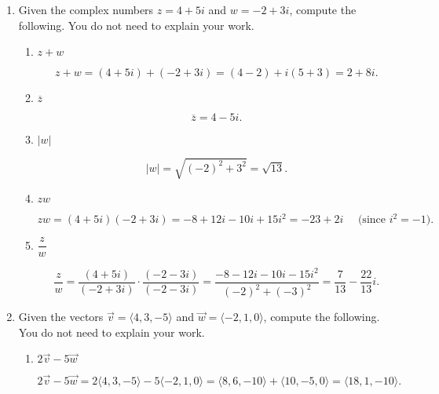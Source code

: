\documentclass[12pt]{article}
\newcommand{\points}[1]{\marginpar{\hspace{24pt}[#1]}}
\newcommand{\abs}[1]{\lvert #1\rvert}
\begin{document}
\begin{enumerate}
\item Given the complex numbers $z=4+5i$ and $w=-2+3i$, compute the following. You do not need to explain your work.
 \begin{enumerate}
\item $z+w$ \points{2}

\bigskip

\[
 z+w = (4+5i)+(-2+3i) = (4-2)+i(5+3) = 2+8i.
\]

\vspace{0.5in}

\item $\overline{z}$ \points{2}

\bigskip

\[
 \overline{z} = 4-5i.
\]

\vspace{0.5in}

\item $\abs{w}$ \points{2}

\bigskip

\[
 \abs{w} = \sqrt{(-2)^2+3^2} = \sqrt{13}.
\]

\vspace{0.5in}

\item $zw$ \points{3}

\bigskip

\[
 zw=(4+5i)(-2+3i) = -8+12i-10i+15i^2 = -23+2i \quad \text{ (since $i^2=-1$)}.
\]

\vspace{0.5in}

\item $\dfrac{z}{w}$ \points{3}

\bigskip

\[
 \frac{z}{w} = \frac{(4+5i)}{(-2+3i)}\cdot\frac{(-2-3i)}{(-2-3i)} = \frac{-8-12i-10i-15i^2}{(-2)^2+(-3)^2} = \frac{7}{13}-\frac{22}{13}i.
\]

\end{enumerate}

\newpage

\item Given the vectors $\vec{v} = \langle 4,3,-5\rangle$ and $\vec{w} = \langle -2,1,0\rangle$, compute the following. You do not need to explain your work.
\begin{enumerate}
 \item $2\vec{v}-5\vec{w}$  \points{2}

\bigskip

\[
 2\vec{v}-5\vec{w} = 2\langle 4,3,-5\rangle -5\langle -2,1,0\rangle = \langle 8,6,-10\rangle+\langle 10,-5,0\rangle = \langle 18,1,-10\rangle.
\]


\end{enumerate}
\end{enumerate}
\end{document}
